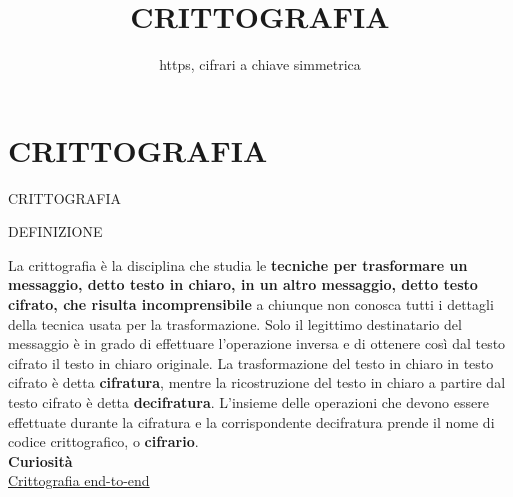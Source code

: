 \documentclass[aspectratio=1610]{beamer}
\title{CRITTOGRAFIA}
\subtitle{https, cifrari a chiave simmetrica}
\date{}
\institute{\textit{
        Fonti:
        \begin{itemize}
            \item[-] \href{https://www.treccani.it/enciclopedia/crittografia\_(Enciclopedia-della-Scienza-e-della-Tecnica)/}{Treccani}
            \item[-] \href{https://it.wikipedia.org/wiki/Storia\_della\_crittografia}{Wikipedia}
        \end{itemize}
    }
}
\begin{document}
\begin{frame}
    \titlepage
\end{frame}

\section{CRITTOGRAFIA}

\begin{frame}{CRITTOGRAFIA}
    \begin{alertblock}{DEFINIZIONE}
        \begin{minipage}{0.98\linewidth}
            \justifying
            La crittografia è la disciplina che studia le \textbf{tecniche per trasformare un messaggio, 
            detto testo in chiaro, in un altro messaggio, detto testo cifrato, che risulta incomprensibile} 
            a chiunque non conosca tutti i dettagli della tecnica usata per la trasformazione. 
            Solo il legittimo destinatario del messaggio è in grado di effettuare l’operazione inversa 
            e di ottenere così dal testo cifrato il testo in chiaro originale. La trasformazione del testo 
            in chiaro in testo cifrato è detta \textbf{cifratura}, mentre la ricostruzione del testo in chiaro 
            a partire dal testo cifrato è detta \textbf{decifratura}. L’insieme delle operazioni che devono 
            essere effettuate durante la cifratura e la corrispondente decifratura prende il nome di codice 
            crittografico, o \textbf{cifrario}.\\
            \bigskip
            \tiny{\textbf{Curiosità}}\\
            \tiny{\href{https://it.wikipedia.org/wiki/Crittografia_end-to-end}{Crittografia end-to-end}}
        \end{minipage}
    \end{alertblock}
\end{frame}
\end{document}
